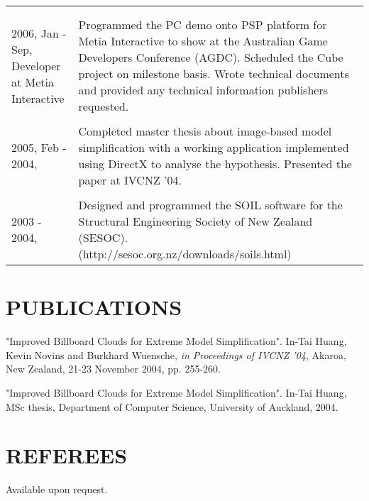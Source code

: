 \begin{resume}
\begin{tabular}{ll}
{}\\\\
\parbox[t]{30mm}{2006, Jan - Sep,\\Developer\\at Metia Interactive} & \parbox[t]{116mm}{

Programmed the PC demo onto PSP platform for Metia Interactive to show at the Australian Game Developers Conference (AGDC). Scheduled the Cube project on milestone basis. Wrote technical documents and provided any technical information publishers requested.

}\\\\
\parbox[t]{30mm}{2005, Feb - \\ 2004,} & \parbox[t]{116mm}{

Completed master thesis about image-based model simplification with a working application implemented using DirectX to analyse the hypothesis. Presented the paper at IVCNZ '04.

}\\\\
\parbox[t]{30mm}{2003 - 2004,} & \parbox[t]{116mm}{

Designed and programmed the SOIL software for the Structural Engineering Society of New Zealand (SESOC).\\(http://sesoc.org.nz/downloads/soils.html)

}\end{tabular} 

\vspace{0.15in} 

\section{PUBLICATIONS} 
\vspace{0.1in}

"Improved Billboard Clouds for Extreme Model Simplification". In-Tai Huang, Kevin Novins and Burkhard Wuensche, \textit{in Proceedings of IVCNZ '04}, Akaroa, New Zealand, 21-23 November 2004, pp. 255-260. 

"Improved Billboard Clouds for Extreme Model Simplification". In-Tai Huang, MSc thesis, Department of Computer Science, University of Auckland, 2004.

\section{REFEREES} 
\vspace{0.1in}

Available upon request.
 
\end{resume}































